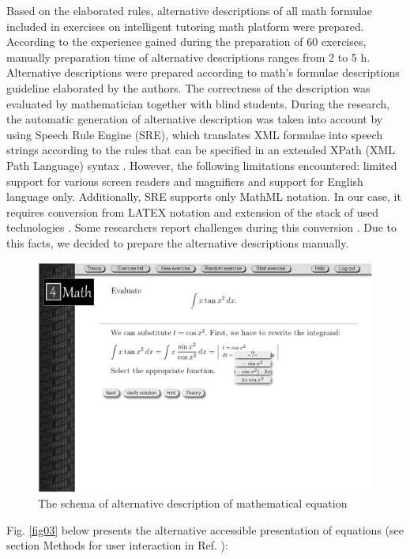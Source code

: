 \documentclass[12pt,1p]{elsarticle}
\begin{document}
	Based on the elaborated rules, alternative descriptions of all math formulae included in exercises on intelligent tutoring math platform were prepared. According to the experience gained during the preparation of 60 exercises, manually preparation time of alternative descriptions ranges from 2 to 5 h. Alternative descriptions were prepared according to math's formulae descriptions guideline elaborated by the authors. The correctness of the description was evaluated by mathematician together with blind students. During the research, the automatic generation of alternative description was taken into account by using Speech Rule Engine (SRE), which translates XML formulae into speech strings according to the rules that can be specified in an extended XPath (XML Path Language) syntax \cite{speech}. However, the following limitations encountered: limited support for various screen readers and magnifiers and support for English language only. Additionally, SRE supports only MathML notation. In our case, it requires conversion from LATEX notation and extension of the stack of used technologies \cite{Sorge:2016}. Some researchers report challenges during this conversion \cite{Wang:2015}. Due to this facts, we decided to prepare the alternative descriptions manually.
	
\begin{figure}[t]
\centering
\includegraphics[width=5in]{./pics/2}
\caption{The schema of alternative description of mathematical equation}
\label{fig02}
\end{figure}

	Fig. \ref{fig03} below presents the alternative accessible presentation of equations (see section Methods for user interaction in Ref. \cite{Brzoza:2014}):
	
\end{document}
